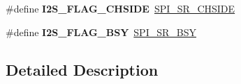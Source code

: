 \begin{DoxyCompactItemize}
\item 
\#define {\bfseries I2\+S\+\_\+\+F\+L\+A\+G\+\_\+\+C\+H\+S\+I\+DE}~\hyperlink{group___peripheral___registers___bits___definition_ga81bd052f0b2e819ddd6bb16c2292a2de}{S\+P\+I\+\_\+\+S\+R\+\_\+\+C\+H\+S\+I\+DE}\hypertarget{group___i2_s___flags___definition_gaf0d629fd522a15aff188236d3254b2ad}{}\label{group___i2_s___flags___definition_gaf0d629fd522a15aff188236d3254b2ad}

\item 
\#define {\bfseries I2\+S\+\_\+\+F\+L\+A\+G\+\_\+\+B\+SY}~\hyperlink{group___peripheral___registers___bits___definition_gaa3498df67729ae048dc5f315ef7c16bf}{S\+P\+I\+\_\+\+S\+R\+\_\+\+B\+SY}\hypertarget{group___i2_s___flags___definition_gac22af2422186105d08a83a7614b54f03}{}\label{group___i2_s___flags___definition_gac22af2422186105d08a83a7614b54f03}

\end{DoxyCompactItemize}


\subsection{Detailed Description}
